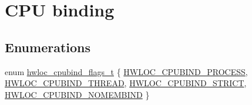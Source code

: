 \hypertarget{a00049}{
\section{CPU binding}
\label{a00049}
}
\subsection*{Enumerations}
\begin{DoxyCompactItemize}
\item 
enum \hyperlink{a00049_ga217dc8d373f8958cc93c154ebce1c71c}{hwloc\_\-cpubind\_\-flags\_\-t} \{ \hyperlink{a00049_gga217dc8d373f8958cc93c154ebce1c71ca2e0dd0128dac6b03408c7dd170477fdc}{HWLOC\_\-CPUBIND\_\-PROCESS}, 
\hyperlink{a00049_gga217dc8d373f8958cc93c154ebce1c71caf1b6bbad00d7b1017b918e3719f4d421}{HWLOC\_\-CPUBIND\_\-THREAD}, 
\hyperlink{a00049_gga217dc8d373f8958cc93c154ebce1c71ca679a7e0f0c7ee06b123565f90d98e7fa}{HWLOC\_\-CPUBIND\_\-STRICT}, 
\hyperlink{a00049_gga217dc8d373f8958cc93c154ebce1c71ca41ce440443cc3087caed95ab60edcad6}{HWLOC\_\-CPUBIND\_\-NOMEMBIND}
 \}
\end{DoxyCompactItemize}
